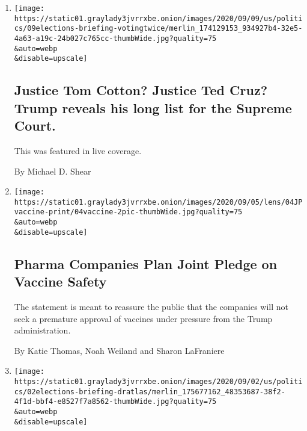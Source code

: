 \begin{enumerate}
\def\labelenumi{\arabic{enumi}.}
\item
  \href{/live/2020/09/09/us/trump-vs-biden/justice-tom-cotton-justice-ted-cruz-trump-reveals-his-long-list-for-the-supreme-court}{}

  \texttt{[image: https://static01.graylady3jvrrxbe.onion/images/2020/09/09/us/politics/09elections-briefing-votingtwice/merlin\_174129153\_934927b4-32e5-4a63-a19c-24b027c765cc-thumbWide.jpg?quality=75\\\&auto=webp\\\&disable=upscale]}

  \hypertarget{justice-tom-cotton-justice-ted-cruz-trump-reveals-his-long-list-for-the-supreme-court}{%
  \subsection{Justice Tom Cotton? Justice Ted Cruz? Trump reveals his
  long list for the Supreme
  Court.}\label{justice-tom-cotton-justice-ted-cruz-trump-reveals-his-long-list-for-the-supreme-court}}

  This was featured in live coverage.

  By Michael D. Shear
\item
  \href{/2020/09/04/science/covid-vaccine-pharma-pledge.html}{}

  \texttt{[image: https://static01.graylady3jvrrxbe.onion/images/2020/09/05/lens/04JPvaccine-print/04vaccine-2pic-thumbWide.jpg?quality=75\\\&auto=webp\\\&disable=upscale]}

  \hypertarget{pharma-companies-plan-joint-pledge-on-vaccine-safety}{%
  \subsection{Pharma Companies Plan Joint Pledge on Vaccine
  Safety}\label{pharma-companies-plan-joint-pledge-on-vaccine-safety}}

  The statement is meant to reassure the public that the companies will
  not seek a premature approval of vaccines under pressure from the
  Trump administration.

  By Katie Thomas, Noah Weiland and Sharon LaFraniere
\item
  \href{/2020/09/02/us/elections/trumps-new-coronavirus-adviser-has-questioned-masks-and-alarmed-government-scientists.html}{}

  \texttt{[image: https://static01.graylady3jvrrxbe.onion/images/2020/09/02/us/politics/02elections-briefing-dratlas/merlin\_175677162\_48353687-38f2-4f1d-bbf4-e8527f7a8562-thumbWide.jpg?quality=75\\\&auto=webp\\\&disable=upscale]}


\end{enumerate}
